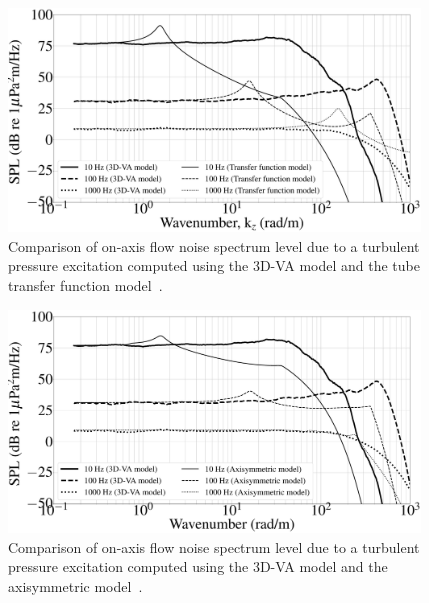 \documentclass[11pt,cleanfoot]{asme2ej}
\begin{document}
\begin{figure}
    \centerline{
    \includegraphics[width=4.3in]{Inside_pressure_comparison_3d_and_approx.eps}}
    \caption{Comparison of on-axis flow noise spectrum level due to a turbulent pressure excitation computed using the 3D-VA model and the tube transfer function model~\cite{knight1996}.} 
    \label{3d vs approx}
\end{figure}
\begin{figure}
    \centerline{
    \includegraphics[width=4.3in]{Inside_pressure_comparison_3d_and_axi.eps}}
    \caption{Comparison of on-axis flow noise spectrum level due to a turbulent pressure excitation computed using the 3D-VA model and the axisymmetric model~\cite{jineesh2013}.}
    \label{3d vs axi}
\end{figure}
\end{document}
